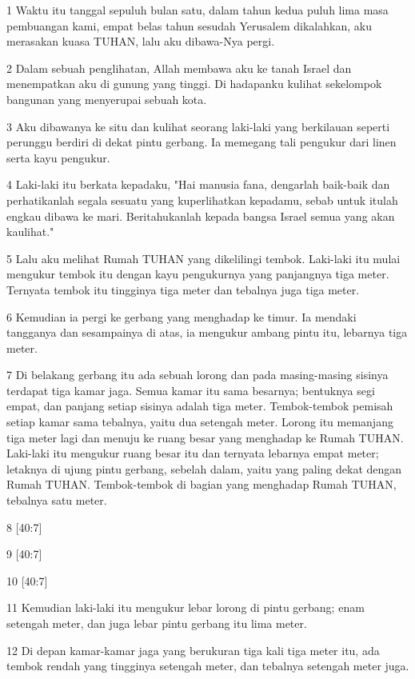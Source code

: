 \par 1 Waktu itu tanggal sepuluh bulan satu, dalam tahun kedua puluh lima masa pembuangan kami, empat belas tahun sesudah Yerusalem dikalahkan, aku merasakan kuasa TUHAN, lalu aku dibawa-Nya pergi.
\par 2 Dalam sebuah penglihatan, Allah membawa aku ke tanah Israel dan menempatkan aku di gunung yang tinggi. Di hadapanku kulihat sekelompok bangunan yang menyerupai sebuah kota.
\par 3 Aku dibawanya ke situ dan kulihat seorang laki-laki yang berkilauan seperti perunggu berdiri di dekat pintu gerbang. Ia memegang tali pengukur dari linen serta kayu pengukur.
\par 4 Laki-laki itu berkata kepadaku, "Hai manusia fana, dengarlah baik-baik dan perhatikanlah segala sesuatu yang kuperlihatkan kepadamu, sebab untuk itulah engkau dibawa ke mari. Beritahukanlah kepada bangsa Israel semua yang akan kaulihat."
\par 5 Lalu aku melihat Rumah TUHAN yang dikelilingi tembok. Laki-laki itu mulai mengukur tembok itu dengan kayu pengukurnya yang panjangnya tiga meter. Ternyata tembok itu tingginya tiga meter dan tebalnya juga tiga meter.
\par 6 Kemudian ia pergi ke gerbang yang menghadap ke timur. Ia mendaki tangganya dan sesampainya di atas, ia mengukur ambang pintu itu, lebarnya tiga meter.
\par 7 Di belakang gerbang itu ada sebuah lorong dan pada masing-masing sisinya terdapat tiga kamar jaga. Semua kamar itu sama besarnya; bentuknya segi empat, dan panjang setiap sisinya adalah tiga meter. Tembok-tembok pemisah setiap kamar sama tebalnya, yaitu dua setengah meter. Lorong itu memanjang tiga meter lagi dan menuju ke ruang besar yang menghadap ke Rumah TUHAN. Laki-laki itu mengukur ruang besar itu dan ternyata lebarnya empat meter; letaknya di ujung pintu gerbang, sebelah dalam, yaitu yang paling dekat dengan Rumah TUHAN. Tembok-tembok di bagian yang menghadap Rumah TUHAN, tebalnya satu meter.
\par 8 [40:7]
\par 9 [40:7]
\par 10 [40:7]
\par 11 Kemudian laki-laki itu mengukur lebar lorong di pintu gerbang; enam setengah meter, dan juga lebar pintu gerbang itu lima meter.
\par 12 Di depan kamar-kamar jaga yang berukuran tiga kali tiga meter itu, ada tembok rendah yang tingginya setengah meter, dan tebalnya setengah meter juga.
